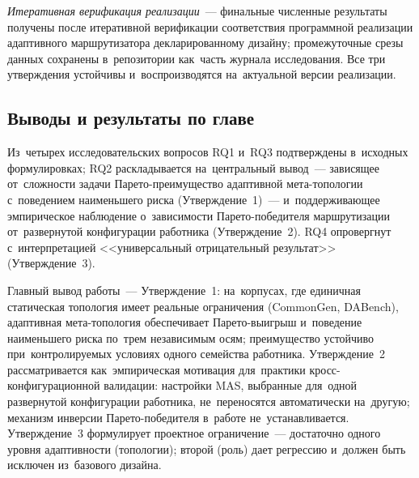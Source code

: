 \emph{Итеративная верификация реализации}~--- финальные численные
результаты получены после итеративной верификации соответствия
программной реализации адаптивного маршрутизатора декларированному
дизайну; промежуточные срезы данных сохранены в~репозитории
как~часть журнала исследования. Все три утверждения устойчивы
и~воспроизводятся на~актуальной версии реализации.

\subsection{Выводы и результаты по главе}
\label{sec:analysis:summary}

Из~четырех исследовательских вопросов RQ1 и~RQ3 подтверждены
в~исходных формулировках; RQ2 раскладывается на~центральный
вывод~--- зависящее от~сложности задачи Парето-преимущество
адаптивной мета-топологии с~поведением наименьшего риска
(Утверждение~1)~--- и~поддерживающее эмпирическое наблюдение
о~зависимости Парето-победителя маршрутизации от~развернутой
конфигурации работника (Утверждение~2). RQ4 опровергнут
с~интерпретацией <<универсальный отрицательный результат>>
(Утверждение~3).

Главный вывод работы~--- Утверждение~1: на~корпусах, где
единичная статическая топология имеет реальные ограничения
(CommonGen, DABench), адаптивная мета-топология обеспечивает
Парето-выигрыш и~поведение наименьшего риска по~трем независимым
осям; преимущество устойчиво при~контролируемых условиях одного
семейства работника. Утверждение~2 рассматривается как~эмпирическая
мотивация для~практики кросс-конфигурационной валидации: настройки
MAS, выбранные для~одной развернутой конфигурации работника,
не~переносятся автоматически на~другую; механизм инверсии
Парето-победителя в~работе не~устанавливается. Утверждение~3
формулирует проектное ограничение~--- достаточно одного уровня
адаптивности (топологии); второй (роль) дает регрессию и~должен
быть исключен из~базового дизайна.
